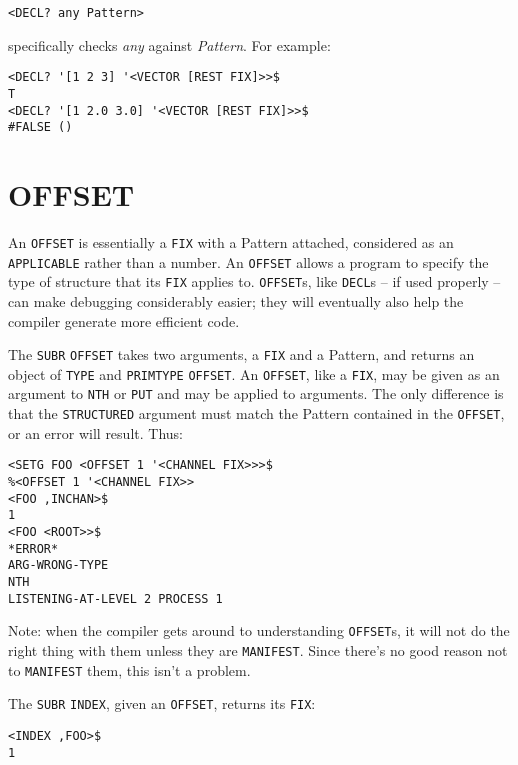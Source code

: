 \documentclass[a4paper]{scrbook}
\begin{document}
\begin{verbatim}
<DECL? any Pattern>
\end{verbatim}

 specifically checks \emph{any} against \emph{Pattern}. For example:

\begin{verbatim}
<DECL? '[1 2 3] '<VECTOR [REST FIX]>>$
T
<DECL? '[1 2.0 3.0] '<VECTOR [REST FIX]>>$
#FALSE ()
\end{verbatim}

\section{OFFSET}\label{offset}

 An \texttt{OFFSET} is essentially a \texttt{FIX} with a Pattern
attached, considered as an \texttt{APPLICABLE} rather than a number. An \texttt{OFFSET} allows a program to specify the
type of structure that its \texttt{FIX} applies to. \texttt{OFFSET}s, like \texttt{DECL}s -- if used properly -- can make
debugging considerably easier; they will eventually also help the compiler generate more efficient code.

The \texttt{SUBR} \texttt{OFFSET} takes two arguments, a \texttt{FIX} and a Pattern, and returns an object of \texttt{TYPE}
and \texttt{PRIMTYPE} \texttt{OFFSET}. An \texttt{OFFSET}, like a \texttt{FIX}, may be given as an argument to \texttt{NTH}
or \texttt{PUT} and may be applied to arguments. The only difference is that the \texttt{STRUCTURED} argument must match
the Pattern contained in the \texttt{OFFSET}, or an error will result. Thus:

\begin{verbatim}
<SETG FOO <OFFSET 1 '<CHANNEL FIX>>>$
%<OFFSET 1 '<CHANNEL FIX>>
<FOO ,INCHAN>$
1
<FOO <ROOT>>$
*ERROR*
ARG-WRONG-TYPE
NTH
LISTENING-AT-LEVEL 2 PROCESS 1
\end{verbatim}

Note: when the compiler gets around to understanding \texttt{OFFSET}s, it will not do the right thing with them unless they
are \texttt{MANIFEST}. Since there's no good reason not to \texttt{MANIFEST} them, this isn't a problem.

The \texttt{SUBR} \texttt{INDEX}, given an \texttt{OFFSET}, returns its \texttt{FIX}:

\begin{verbatim}
<INDEX ,FOO>$
1
\end{verbatim}
\end{document}
